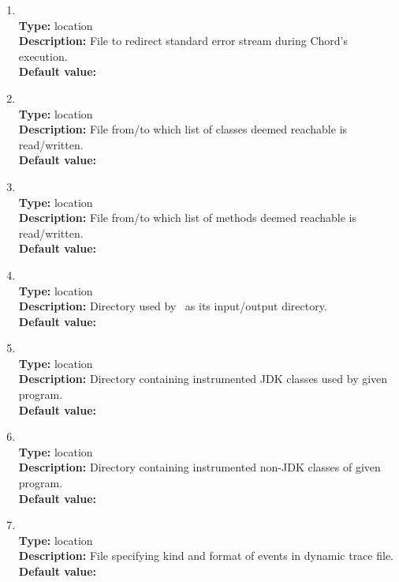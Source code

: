 \begin{enumerate}
\item
{} \\
{\bf Type:} location \\
{\bf Description:} File to redirect standard error stream during Chord's execution. \\
{\bf Default value:} 

\item
{} \\
{\bf Type:} location \\
{\bf Description:} File from/to which list of classes deemed reachable is read/written. \\
{\bf Default value:} 

\item
{} \\
{\bf Type:} location \\
{\bf Description:} File from/to which list of methods deemed reachable is read/written. \\
{\bf Default value:} 

\item
{} \\
{\bf Type:} location \\
{\bf Description:} Directory used by \bddbddb\ as its input/output directory. \\
{\bf Default value:} 

\item
{} \\
{\bf Type:} location \\
{\bf Description:} Directory containing instrumented JDK classes used by given program. \\
{\bf Default value:}  

\item
{} \\
{\bf Type:} location \\
{\bf Description:} Directory containing instrumented non-JDK classes of given program. \\
{\bf Default value:}  

\item
{} \\
{\bf Type:} location \\
{\bf Description:} File specifying kind and format of events in dynamic trace file. \\
{\bf Default value:} 


\end{enumerate}
